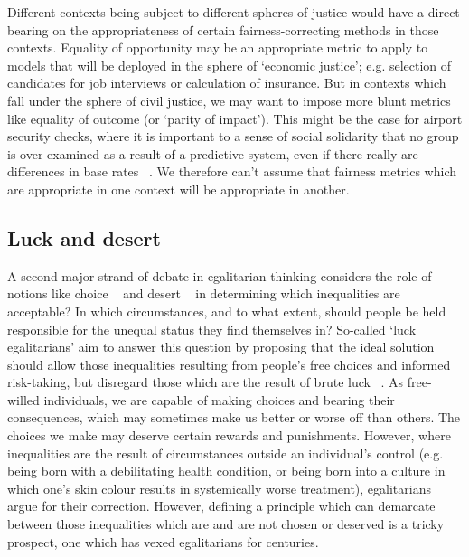 \documentclass[pmlr,twocolumn,10pt]{jmlr}%
\begin{document}
Different contexts being subject to different spheres of justice would have a direct bearing on the appropriateness of certain fairness-correcting methods in those contexts. Equality of opportunity may be an appropriate metric to apply to models that will be deployed in the sphere of `economic justice'; e.g. selection of candidates for job interviews or calculation of insurance. But in contexts which fall under the sphere of civil justice, we may want to impose more blunt metrics like equality of outcome (or `parity of impact'). This might be the case for airport security checks, where it is important to a sense of social solidarity that no group is over-examined as a result of a predictive system, even if there really are differences in base rates ~\cite{hellman2008discrimination}. We therefore can't assume that fairness metrics which are appropriate in one context will be appropriate in another.


\subsection{Luck and desert}

A second major strand of debate in egalitarian thinking considers the role of notions like choice ~\cite{huseby2016can} and desert ~\cite{temkin1986inequality} in determining which inequalities are acceptable? In which circumstances, and to what extent, should people be held responsible for the unequal status they find themselves in? So-called `luck egalitarians' aim to answer this question by proposing that the ideal solution should allow those inequalities resulting from people's free choices and informed risk-taking, but disregard those which are the result of brute luck ~\cite{arneson1989equality}. As free-willed individuals, we are capable of making choices and bearing their consequences, which may sometimes make us better or worse off than others. The choices we make may deserve certain rewards and punishments. However, where inequalities are the result of circumstances outside an individual's control (e.g. being born with a debilitating health condition, or being born into a culture in which one's skin colour results in systemically worse treatment), egalitarians argue for their correction. However, defining a principle which can demarcate between those inequalities which are and are not chosen or deserved is a tricky prospect, one which has vexed egalitarians for centuries.
\end{document}
